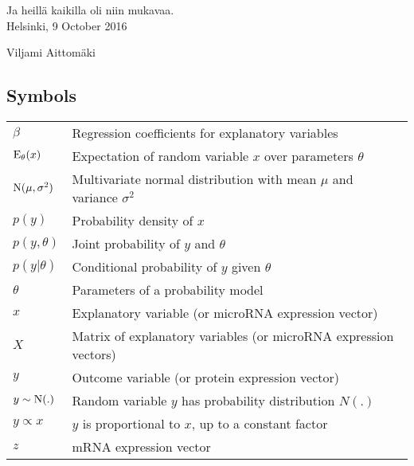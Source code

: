 \documentclass[english,12pt,a4paper,pdftex,elec,utf8]{aaltothesis}
\begin{document}

\newpage

Ja heillä kaikilla oli niin mukavaa.\\

\vspace{5cm}
Helsinki, 9 October 2016

\vspace{5mm}
{\hfill Viljami Aittom\"aki \hspace{1cm}}


\newpage


\thesistableofcontents














\subsection*{Symbols}

\begin{tabular}{ll}
$\beta$                    & Regression coefficients for explanatory variables \\
$\textup{E}_{\theta}(x)$   & Expectation of random variable $x$ over parameters $\theta$ \\
$\textup{N}(\mu,\sigma^2)$ & Multivariate normal distribution with mean $\mu$ and variance $\sigma^2$ \\
$p(y)$                     & Probability density of $x$ \\
$p(y,\theta)$              & Joint probability of $y$ and $\theta$ \\
$p(y|\theta)$              & Conditional probability of $y$ given $\theta$ \\
$\theta$                   & Parameters of a probability model \\
$x$                        & Explanatory variable (or microRNA expression vector) \\
$X$                        & Matrix of explanatory variables (or microRNA expression vectors) \\
$y$                        & Outcome variable (or protein expression vector) \\
$y \sim \textup{N}(.)$     & Random variable $y$ has probability distribution $N(.)$ \\
$y \propto x$              & $y$ is proportional to $x$, up to a constant factor \\
$z$                        & mRNA expression vector
\end{tabular}
\end{document}
